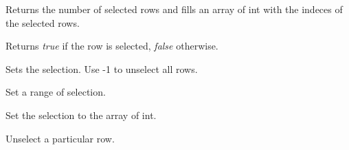 
Returns the number of selected rows and fills an array of int
with the indeces of the selected rows.

\label{wxdataviewctrlisselected}


Returns {\it true} if the row is selected, {\it false} otherwise.

\label{wxdataviewctrlsetselection}


Sets the selection. Use -1 to unselect all rows.

\label{wxdataviewctrlsetselectionrange}


Set a range of selection.

\label{wxdataviewctrlsetselections}


Set the selection to the array of int.

\label{wxdataviewctrlunselect}


Unselect a particular row.

